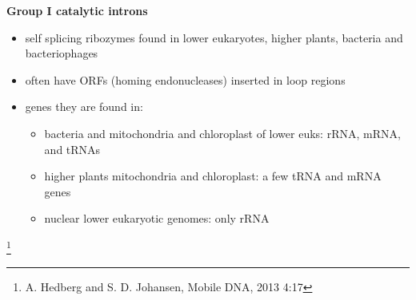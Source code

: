 \documentclass[landscape]{slides}
\begin{document}
\begin{slide}
\begin{center}
\textbf{Group I catalytic introns}
\end{center}
%
\small
\begin{itemize}
\item self splicing ribozymes found in lower eukaryotes, higher
  plants, bacteria and bacteriophages
\item often have ORFs (homing endonucleases) inserted in loop regions
\item genes they are found in:
\begin {itemize}
\item bacteria and mitochondria and chloroplast of lower euks: rRNA, mRNA, and tRNAs
\item higher plants mitochondria and chloroplast: a few tRNA and mRNA genes
\item nuclear lower eukaryotic genomes: only rRNA
\end{itemize}
\end{itemize}

\footnote{\small{A. Hedberg and S. D. Johansen, Mobile DNA, 2013 4:17}}


\vfill
\end{slide}
\end{document}

